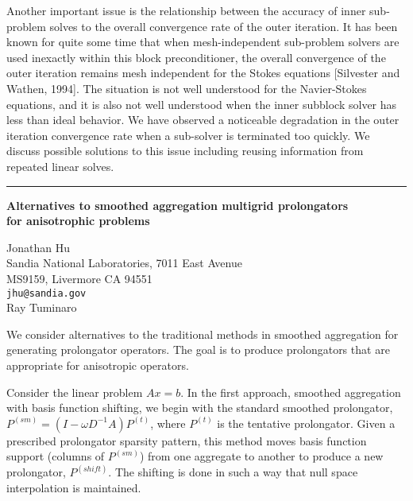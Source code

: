\documentclass[twosided]{report}
\begin{document}
Another important issue is the relationship
between the accuracy of inner sub-problem solves to the
overall convergence rate of the outer iteration. It has been
known for quite some time that when mesh-independent
sub-problem solvers are used inexactly within this block
preconditioner, the overall convergence of the outer
iteration remains mesh independent for the Stokes equations
[Silvester and Wathen, 1994]. The situation is not well
understood for the Navier-Stokes equations, and it is also
not well understood when the inner subblock solver has less
than ideal behavior. We have observed a noticeable
degradation in the outer iteration convergence rate when a
sub-solver is terminated too quickly. We discuss possible
solutions to this issue including reusing information from
repeated linear solves.



	\begin{center} \rule{6in}{1pt} \end{center}

\begin{center}
{\large			%
{\bf Alternatives to smoothed aggregation multigrid prolongators \\
	for anisotrophic problems}}

	Jonathan Hu \\
	Sandia National Laboratories, 7011 East Avenue \\
	MS9159, Livermore CA 94551 \\
	{\tt jhu@sandia.gov} \\
	Ray Tuminaro
\end{center}
We consider alternatives to the traditional methods in
smoothed aggregation for generating prolongator operators.
The goal is to produce prolongators that are appropriate for
anisotropic operators.

Consider the linear problem
$Ax=b$. In the first approach, smoothed aggregation with
basis function shifting, we begin with the standard smoothed
prolongator,
$P^{(sm)} = (I - \omega D^{-1} A) P^{(t)}$,
where $P^{(t)}$ is the tentative prolongator.
Given a
prescribed prolongator sparsity pattern, this method moves
basis function support (columns of $P^{(sm)}$) from one
aggregate to another to produce a new prolongator,
$P^{(shift)}$.
The shifting is done in such a way that null
space interpolation is maintained.
\end{document}
